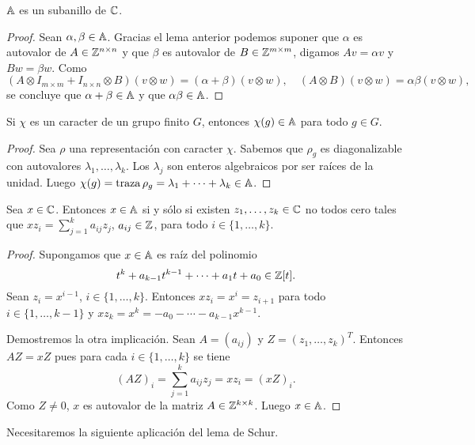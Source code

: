 \begin{theorem}
  \label{theorem:subanillo}
  $\mathbb{A}$ es un subanillo de $\mathbb{C}$.
\end{theorem}

\begin{proof}
  Sean $\alpha,\beta\in\mathbb{A}$. Gracias el lema anterior podemos suponer que $\alpha$ es autovalor de
  $A\in\mathbb{Z}^{n\times n}$ y que $\beta$ es autovalor de $B\in\mathbb{Z}^{m\times m}$, digamos
  $Av=\alpha v$ y $Bw=\beta w$.  Como 
  \[
	(A\otimes I_{m\times m}+I_{n\times n}\otimes B)(v\otimes w)=(\alpha+\beta)(v\otimes w),
	\quad
	(A\otimes B)(v\otimes w)=\alpha\beta(v\otimes w),
  \]
  se concluye que $\alpha+\beta\in\mathbb{A}$ y que $\alpha\beta\in\mathbb{A}$. 
\end{proof}

\begin{theorem}
  \label{theorem:chi(g)inA}
  Si $\chi$ es un caracter de un grupo finito $G$, entonces $\chi(g)\in\mathbb{A}$ para todo
  $g\in G$.
\end{theorem}

\begin{proof}
  Sea $\rho$ una representación con caracter $\chi$. Sabemos que $\rho_g$
  es diagonalizable con autovalores $\lambda_1,\dots,\lambda_k$. Los
  $\lambda_j$ son enteros algebraicos por ser raíces de la unidad. Luego
  $\chi(g)=\operatorname{traza}\rho_g=\lambda_1+\cdots+\lambda_k\in\mathbb{A}$.
\end{proof}

\begin{lemma}
  \label{lem:combinacion_lineal}
  Sea $x\in\mathbb{C}$. Entonces $x\in\mathbb{A}$ si y sólo si existen $z_1,\dots,z_k\in\mathbb{C}$ no
  todos cero tales que $xz_i=\sum_{j=1}^ka_{ij}z_j$, $a_{ij}\in\mathbb{Z}$, para todo
  $i\in\{1,\dots,k\}$.
\end{lemma}

\begin{proof}
  Supongamos que $x\in\mathbb{A}$ es raíz del polinomio 
  \[
    t^k+a_{k-1}t^{k-1}+\cdots+a_1t+a_0\in\mathbb{Z}[t].
  \]
  Sean $z_i=x^{i-1}$, $i\in\{1,\dots,k\}$. Entonces $xz_i=x^i=z_{i+1}$ para
  todo $i\in\{1,\dots,k-1\}$ y $xz_{k}=x^k=-a_{0}-\cdots-a_{k-1}x^{k-1}$.

  Demostremos la otra implicación. Sean $A=(a_{ij})$ y $Z=(z_1,\dots,z_k)^T$. 
  Entonces $AZ=xZ$ pues para cada $i\in\{1,\dots,k\}$ se tiene
  \[
    (AZ)_i=\sum_{j=1}^ka_{ij}z_j=xz_i=(xZ)_i.
  \]
  Como $Z\ne0$, $x$ es autovalor de la matriz $A\in\mathbb{Z}^{k\times k}$. Luego
  $x\in\mathbb{A}$.
\end{proof}

Necesitaremos la siguiente aplicación del lema de Schur.

